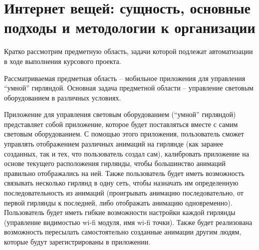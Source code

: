 \section{Интернет вещей: сущность, основные подходы и методологии к организации}
\label{sec:subject}

Кратко рассмотрим предметную область, задачи которой подлежат автоматизации в ходе выполнения курсового проекта.

Рассматриваемая предметная область – мобильное приложения для управления ``умной'' гирляндой. Основная задача предметной области – управление световым оборудованием в различных условиях.

Приложение для управления световым оборудованием (``умной'' гирляндой) представляет собой приложение, которое будет поставляться вместе с самим световым оборудованием. С помощью этого приложения, пользователь сможет управлять отображением различных анимаций на гирлянде (как заранее созданных, так и тех, что пользователь создал сам), калибровать приложение на основе текущего расположения гирлянды, чтобы большинство анимаций правильно отображались на ней. Также пользователь будет иметь возможность связывать несколько гирлянд в одну сеть, чтобы назначать им определенную последовательность из анимаций (проигрывать анимацию последовательно, от первой гирлянды к последней, либо отображать анимацию одновременно). Пользователь будет иметь гибкие возможности настройки каждой гирлянды (управление видимостью wi-fi модуля, имя wi-fi точки). Также будет реализована возможность пересылать самостоятельно созданные анимации другим людям, которые будут зарегистрированы в приложении.








